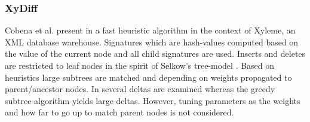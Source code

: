 \subsubsection{XyDiff\cite{cobena2002detecting}}
Cobena et al. present in \cite{cobena2002detecting} a fast heuristic algorithm in the context of Xyleme, an XML database warehouse. %
Signatures which are hash-values computed based on the value of the current node and all child signatures are used. Inserts and deletes are restricted to leaf nodes in the spirit of Selkow's tree-model \cite{tai1979tree}. Based on heuristics large subtrees are matched and depending on weights propagated to parent/ancestor nodes. In \cite{ronnau2009efficient} several deltas are examined whereas the greedy subtree-algorithm yields large deltas. However, tuning parameters as the weights and how far to go up to match parent nodes is not considered.


